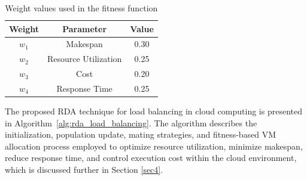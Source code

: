 \documentclass[pdflatex,sn-mathphys-num]{sn-jnl}%
\begin{document}
\begin{table}[htbp]
\centering
\caption{Weight values used in the fitness function}
\label{tab:weights}
\begin{tabular}{|c|c|c|}
\hline
\textbf{Weight} & \textbf{Parameter} & \textbf{Value} \\ \hline
$w_1$ & Makespan & 0.30 \\ \hline
$w_2$ & Resource Utilization & 0.25 \\ \hline
$w_3$ & Cost & 0.20 \\ \hline
$w_4$ & Response Time & 0.25 \\ \hline
\end{tabular}
\end{table}

The proposed RDA technique for load balancing in cloud computing is presented in Algorithm~\ref{alg:rda_load_balancing}. The algorithm describes the initialization, population update, mating strategies, and fitness-based VM allocation process employed to optimize resource utilization, minimize makespan, reduce response time, and control execution cost within the cloud environment, which is discussed further in Section \ref{sec4}.
\end{document}
